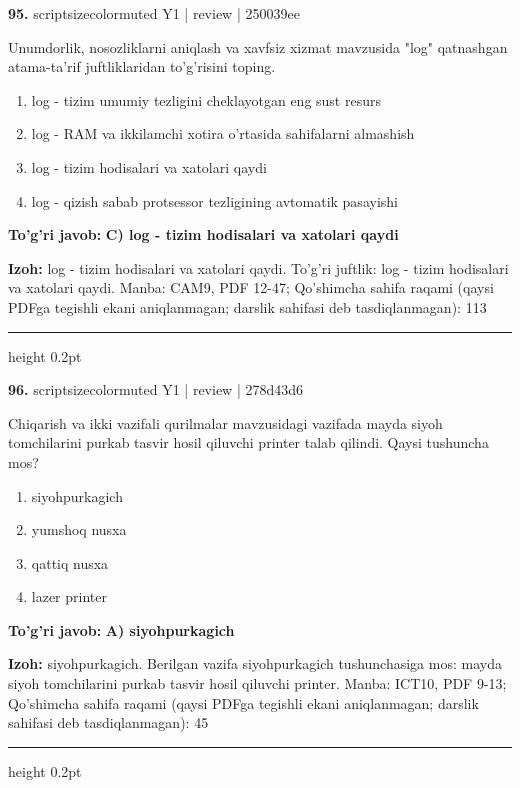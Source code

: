 \documentclass[10pt,a4paper]{article}
\begin{document}
{\bfseries\sffamily\color{ink} 95.} {scriptsizecolor{muted} Y1 | review | 250039ee}
\par
Unumdorlik, nosozliklarni aniqlash va xavfsiz xizmat mavzusida "log" qatnashgan atama-ta'rif juftliklaridan to'g'risini toping.
\begin{enumerate}[label=\Alph*),leftmargin=9mm]
\item log - tizim umumiy tezligini cheklayotgan eng sust resurs
\item log - RAM va ikkilamchi xotira o'rtasida sahifalarni almashish
\item log - tizim hodisalari va xatolari qaydi
\item log - qizish sabab protsessor tezligining avtomatik pasayishi
\end{enumerate}
\begin{tcolorbox}[enhanced,breakable,colback=teal!4,colframe=teal!60!black,boxrule=0.45pt,arc=1.2mm,left=2.7mm,right=2.7mm,top=1.8mm,bottom=1.8mm,before skip=2mm,after skip=2mm]
{\bfseries\sffamily\color{teal}To'g'ri javob:} \textbf{C) log - tizim hodisalari va xatolari qaydi}
\par\smallskip
{\bfseries Izoh:} log - tizim hodisalari va xatolari qaydi. To'g'ri juftlik: log - tizim hodisalari va xatolari qaydi. Manba: CAM9, PDF 12-47; Qo'shimcha sahifa raqami (qaysi PDFga tegishli ekani aniqlanmagan; darslik sahifasi deb tasdiqlanmagan): 113
\end{tcolorbox}
\vspace{2mm}\hrule height 0.2pt\vspace{3mm}

{\bfseries\sffamily\color{ink} 96.} {scriptsizecolor{muted} Y1 | review | 278d43d6}
\par
Chiqarish va ikki vazifali qurilmalar mavzusidagi vazifada mayda siyoh tomchilarini purkab tasvir hosil qiluvchi printer talab qilindi. Qaysi tushuncha mos?
\begin{enumerate}[label=\Alph*),leftmargin=9mm]
\item siyohpurkagich
\item yumshoq nusxa
\item qattiq nusxa
\item lazer printer
\end{enumerate}
\begin{tcolorbox}[enhanced,breakable,colback=teal!4,colframe=teal!60!black,boxrule=0.45pt,arc=1.2mm,left=2.7mm,right=2.7mm,top=1.8mm,bottom=1.8mm,before skip=2mm,after skip=2mm]
{\bfseries\sffamily\color{teal}To'g'ri javob:} \textbf{A) siyohpurkagich}
\par\smallskip
{\bfseries Izoh:} siyohpurkagich. Berilgan vazifa siyohpurkagich tushunchasiga mos: mayda siyoh tomchilarini purkab tasvir hosil qiluvchi printer. Manba: ICT10, PDF 9-13; Qo'shimcha sahifa raqami (qaysi PDFga tegishli ekani aniqlanmagan; darslik sahifasi deb tasdiqlanmagan): 45
\end{tcolorbox}
\vspace{2mm}\hrule height 0.2pt\vspace{3mm}
\end{document}
